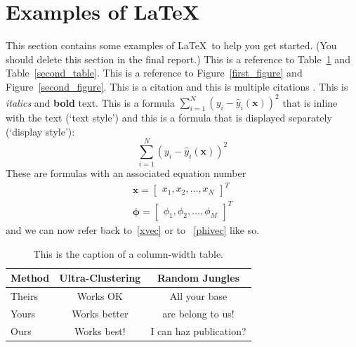 \documentclass[10pt,twocolumn,letterpaper]{article}
\begin{document}
\section{Examples of \LaTeX}


This section contains some examples of \LaTeX~to help you get started.
(You should delete this section in the final report.)
This is a reference to Table~\ref{first_table} and Table~\ref{second_table}.
This is a reference to Figure~\ref{first_figure} and Figure~\ref{second_figure}.
This is a citation \cite{breiman2001statistical} and this is
multiple citations \cite{breiman2001statistical,bishop2006pattern}.
This is \textit{italics} and \textbf{bold} text.
This is a formula $\sum_{i=1}^N (y_i - \hat{y}_i(\mathbf{x}))^2$
that is inline with the text (`text style') and this is a
formula that is displayed separately (`display style'):
$$
\sum_{i=1}^N (y_i - \hat{y}_i(\mathbf{x}))^2
$$
These are formulas with an associated equation number
\begin{align}
   \mathbf{x} = \begin{bmatrix}
      x_1, x_2, \ldots, x_N
   \end{bmatrix}^T    \label{xvec}\\
   \boldsymbol{\phi} = \begin{bmatrix}
      \phi_1, \phi_2, \ldots, \phi_M
   \end{bmatrix}^T    \label{phivec}
\end{align}
and we can now refer back to~\eqref{xvec} or to ~\eqref{phivec} like so.



\begin{table}
   \begin{center}
   \begin{tabular}{|l|c|c|}
   \hline
   Method & Ultra-Clustering & Random Jungles \\
   \hline\hline
   Theirs & Works OK & All your base\\
   Yours & Works better & are belong to us!\\
   Ours & Works best! & I can haz publication?\\
   \hline
   \end{tabular}
   \end{center}
   \caption{This is the caption of a column-width table.\label{first_table}}
\end{table}
\end{document}
